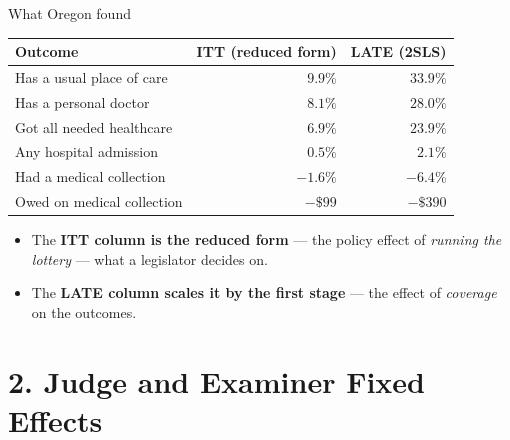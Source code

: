 \documentclass[
  11pt,
  ignorenonframetext,
  aspectratio=169,
]{beamer}
\providecommand{\tightlist}{%
  \setlength{\itemsep}{0pt}\setlength{\parskip}{0pt}}
\begin{document}
\begin{frame}{What Oregon found}
\protect{}\label{what-oregon-found}
\begin{center}
\small
\begin{tabular}{lrr}
\toprule
Outcome & ITT (reduced form) & LATE (2SLS) \\
\midrule
Has a usual place of care      & $9.9\%$  & $33.9\%$ \\
Has a personal doctor          & $8.1\%$  & $28.0\%$ \\
Got all needed healthcare      & $6.9\%$  & $23.9\%$ \\
Any hospital admission         & $0.5\%$  & $2.1\%$  \\
Had a medical collection       & $-1.6\%$ & $-6.4\%$ \\
Owed on medical collection     & $-\$99$  & $-\$390$ \\
\bottomrule
\end{tabular}
\end{center}

\begin{itemize}
\tightlist
\item
  The \textbf{ITT column is the reduced form} --- the policy effect of
  \emph{running the lottery} --- what a legislator decides on.
\item
  The \textbf{LATE column scales it by the first stage} --- the effect
  of \emph{coverage} on the outcomes.
\end{itemize}
\end{frame}

\section{2. Judge and Examiner Fixed
Effects}\label{judge-and-examiner-fixed-effects}
\end{document}
